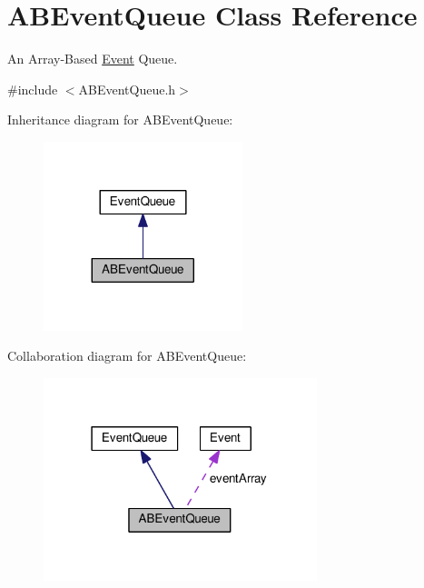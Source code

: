 \hypertarget{class_a_b_event_queue}{}\section{A\+B\+Event\+Queue Class Reference}
\label{class_a_b_event_queue}


An Array-\/\+Based \hyperlink{struct_event}{Event} Queue.  




{\ttfamily \#include $<$A\+B\+Event\+Queue.\+h$>$}



Inheritance diagram for A\+B\+Event\+Queue\+:
\nopagebreak
\begin{figure}[H]
\begin{center}
\leavevmode
\includegraphics[width=164pt]{class_a_b_event_queue__inherit__graph}
\end{center}
\end{figure}


Collaboration diagram for A\+B\+Event\+Queue\+:
\nopagebreak
\begin{figure}[H]
\begin{center}
\leavevmode
\includegraphics[width=226pt]{class_a_b_event_queue__coll__graph}
\end{center}
\end{figure}
